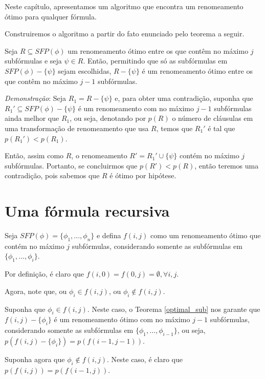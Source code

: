 
\indent

Neste capítulo, apresentamos um algoritmo que encontra um renomeamento ótimo para qualquer fórmula.

Construiremos o algoritmo a partir do fato enunciado pelo teorema a seguir.

\begin{theorem}
	\label{optimal_sub}
	Seja $R \subseteq SFP(\phi)$ um renomeamento ótimo entre os que contêm no máximo $j$ subfórmulas e seja $\psi \in R$. Então, permitindo que só as subfórmulas em $SFP(\phi) - \{\psi \}$ sejam escolhidas, $R - \{\psi\}$ é um renomeamento ótimo entre os que contêm no máximo $j-1$ subfórmulas.
\end{theorem}

\emph{Demonstração}: Seja $R_1 = R - \{\psi\}$ e, para obter uma contradição, suponha que $R_1' \subseteq SFP(\phi) - \{\psi \}$ é um renomeamento com no máximo $j-1$ subfórmulas ainda melhor que $R_1$, ou seja, denotando por $p(R)$ o número de cláusulas em uma transformação de renomeamento que usa $R$, temos que $R_1'$ é tal que $p(R_1') < p(R_1)$.

Então, assim como $R$, o renomeamento $R' = R_1' \cup \{\psi \}$ contém no máximo $j$ subfórmulas. Portanto, se concluirmos que $p(R') < p(R)$, então teremos uma contradição, pois sabemos que $R$ é ótimo por hipótese.

\section{Uma fórmula recursiva}

\indent

Seja $SFP(\phi) = \{\phi_1,...,\phi_n \}$ e defina $f(i,j)$ como um renomeamento ótimo que contém no máximo $j$ subfórmulas, considerando somente as subfórmulas em $\{\phi_1,...,\phi_i \}$.

Por definição, é claro que $f(i,0) = f(0,j) = \emptyset, \forall i,j$.

Agora, note que, ou $\phi_i \in f(i,j)$, ou $\phi_i \notin f(i,j)$.

Suponha que $\phi_i \in f(i,j)$. Neste caso, o Teorema \ref{optimal_sub} nos garante que $f(i,j) - \{\phi_i \}$ é um renomeamento ótimo com no máximo $j-1$ subfórmulas, considerando somente as subfórmulas em $\{\phi_1,...,\phi_{i-1} \}$, ou seja, $p(f(i,j) - \{\phi_i \}) = p(f(i-1,j-1))$.

Suponha agora que $\phi_i \notin f(i,j)$. Neste caso, é claro que $p(f(i,j)) = p(f(i-1,j))$.

